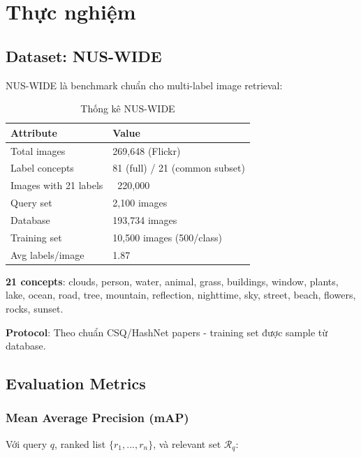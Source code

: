 \documentclass[12pt,a4paper]{article}
\begin{document}
\section{Thực nghiệm}

\subsection{Dataset: NUS-WIDE}

NUS-WIDE \cite{chua2009nuswide} là benchmark chuẩn cho multi-label image retrieval:

\begin{table}[H]
\centering
\caption{Thống kê NUS-WIDE}
\begin{tabular}{ll}
\toprule
\textbf{Attribute} & \textbf{Value} \\
\midrule
Total images & 269,648 (Flickr) \\
Label concepts & 81 (full) / 21 (common subset) \\
Images with 21 labels & ~220,000 \\
Query set & 2,100 images \\
Database & 193,734 images \\
Training set & 10,500 images (500/class) \\
Avg labels/image & 1.87 \\
\bottomrule
\end{tabular}
\end{table}

\textbf{21 concepts}: clouds, person, water, animal, grass, buildings, window, plants, lake, ocean, road, tree, mountain, reflection, nighttime, sky, street, beach, flowers, rocks, sunset.

\textbf{Protocol}: Theo chuẩn CSQ/HashNet papers - training set được sample từ database.

\subsection{Evaluation Metrics}

\subsubsection{Mean Average Precision (mAP)}

Với query $q$, ranked list $\{r_1, ..., r_n\}$, và relevant set $\mathcal{R}_q$:
\end{document}
